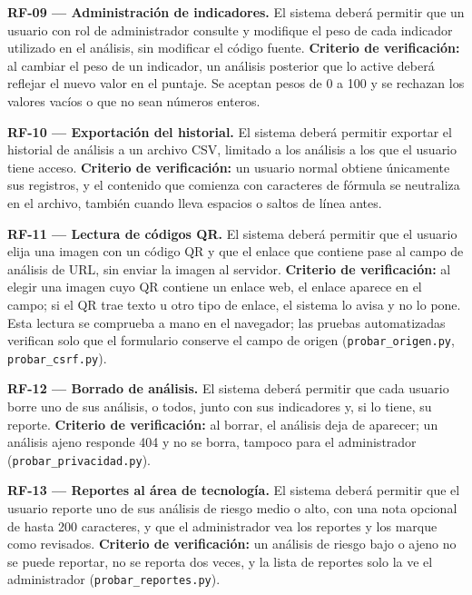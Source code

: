\documentclass[journal,onecolumn,12pt,draftclsnofoot]{IEEEtran}
\begin{document}
\par\medskip\noindent\textbf{RF-09 --- Administración de indicadores.} El sistema deberá permitir que un usuario con rol de administrador consulte y modifique el peso de cada indicador utilizado en el análisis, sin modificar el código fuente. \textbf{Criterio de verificación:} al cambiar el peso de un indicador, un análisis posterior que lo active deberá reflejar el nuevo valor en el puntaje. Se aceptan pesos de 0 a 100 y se rechazan los valores vacíos o que no sean números enteros.

\par\medskip\noindent\textbf{RF-10 --- Exportación del historial.} El sistema deberá permitir exportar el historial de análisis a un archivo CSV, limitado a los análisis a los que el usuario tiene acceso. \textbf{Criterio de verificación:} un usuario normal obtiene únicamente sus registros, y el contenido que comienza con caracteres de fórmula se neutraliza en el archivo, también cuando lleva espacios o saltos de línea antes.

\par\medskip\noindent\textbf{RF-11 --- Lectura de códigos QR.} El sistema deberá permitir que el usuario elija una imagen con un código QR y que el enlace que contiene pase al campo de análisis de URL, sin enviar la imagen al servidor. \textbf{Criterio de verificación:} al elegir una imagen cuyo QR contiene un enlace web, el enlace aparece en el campo; si el QR trae texto u otro tipo de enlace, el sistema lo avisa y no lo pone. Esta lectura se comprueba a mano en el navegador; las pruebas automatizadas verifican solo que el formulario conserve el campo de origen (\texttt{probar\_origen.py}, \texttt{probar\_csrf.py}).

\par\medskip\noindent\textbf{RF-12 --- Borrado de análisis.} El sistema deberá permitir que cada usuario borre uno de sus análisis, o todos, junto con sus indicadores y, si lo tiene, su reporte. \textbf{Criterio de verificación:} al borrar, el análisis deja de aparecer; un análisis ajeno responde 404 y no se borra, tampoco para el administrador (\texttt{probar\_privacidad.py}).

\par\medskip\noindent\textbf{RF-13 --- Reportes al área de tecnología.} El sistema deberá permitir que el usuario reporte uno de sus análisis de riesgo medio o alto, con una nota opcional de hasta 200 caracteres, y que el administrador vea los reportes y los marque como revisados. \textbf{Criterio de verificación:} un análisis de riesgo bajo o ajeno no se puede reportar, no se reporta dos veces, y la lista de reportes solo la ve el administrador (\texttt{probar\_reportes.py}).
\end{document}
